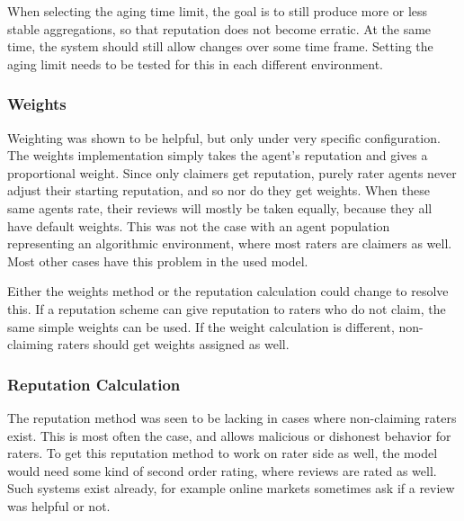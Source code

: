 \documentclass[%
    ]{\PathToTumTemplate/thesis/tum_thesis}
\begin{document}
When selecting the aging time limit, the goal is to still produce more or less stable aggregations, so that reputation does not become erratic.
At the same time, the system should still allow changes over some time frame.
Setting the aging limit needs to be tested for this in each different environment.

\subsubsection{Weights}
Weighting was shown to be helpful, but only under very specific configuration.
The weights implementation simply takes the agent's reputation and gives a proportional weight.
Since only claimers get reputation, purely rater agents never adjust their starting reputation, and so nor do they get weights.
When these same agents rate, their reviews will mostly be taken equally, because they all have default weights.
This was not the case with an agent population representing an algorithmic environment, where most raters are claimers as well.
Most other cases have this problem in the used model.

Either the weights method or the reputation calculation could change to resolve this.
If a reputation scheme can give reputation to raters who do not claim, the same simple weights can be used.
If the weight calculation is different, non-claiming raters should get weights assigned as well.



\subsubsection{Reputation Calculation}
The reputation method was seen to be lacking in cases where non-claiming raters exist.
This is most often the case, and allows malicious or dishonest behavior for raters.
To get this reputation method to work on rater side as well, the model would need some kind of second order rating, where reviews are rated as well.
Such systems exist already, for example online markets sometimes ask if a review was helpful or not.

\end{document}
